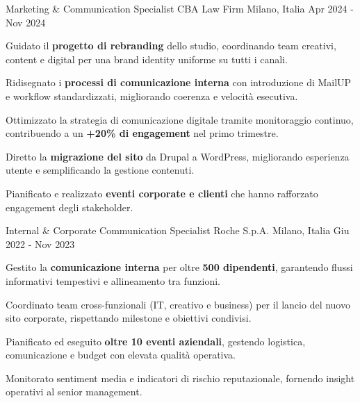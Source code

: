 \begin{cventries}
\cventry
{Marketing \& Communication Specialist} %
{CBA Law Firm} %
{Milano, Italia} %
{Apr 2024 - Nov 2024} %
{
\begin{cvitems}
\item Guidato il \textbf{progetto di rebranding} dello studio, coordinando team creativi, content e digital per una brand identity uniforme su tutti i canali.
\item Ridisegnato i \textbf{processi di comunicazione interna} con introduzione di MailUP e workflow standardizzati, migliorando coerenza e velocità esecutiva.
\item Ottimizzato la strategia di comunicazione digitale tramite monitoraggio continuo, contribuendo a un \textbf{+20\% di engagement} nel primo trimestre.
\item Diretto la \textbf{migrazione del sito} da Drupal a WordPress, migliorando esperienza utente e semplificando la gestione contenuti.
\item Pianificato e realizzato \textbf{eventi corporate e clienti} che hanno rafforzato engagement degli stakeholder.
\end{cvitems}
}

\cventry
{Internal \& Corporate Communication Specialist} %
{Roche S.p.A.} %
{Milano, Italia} %
{Giu 2022 - Nov 2023} %
{
\begin{cvitems}
\item Gestito la \textbf{comunicazione interna} per oltre \textbf{500 dipendenti}, garantendo flussi informativi tempestivi e allineamento tra funzioni.
\item Coordinato team cross-funzionali (IT, creativo e business) per il lancio del nuovo sito corporate, rispettando milestone e obiettivi condivisi.
\item Pianificato ed eseguito \textbf{oltre 10 eventi aziendali}, gestendo logistica, comunicazione e budget con elevata qualità operativa.
\item Monitorato sentiment media e indicatori di rischio reputazionale, fornendo insight operativi al senior management.
\end{cvitems}
}

\end{cventries}
